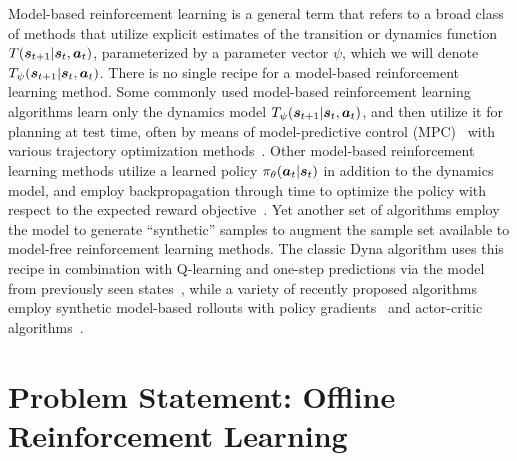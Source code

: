 \documentclass[../thesis.tex]{subfiles}
\begin{document}
Model-based reinforcement learning is a general term that refers to a broad class of methods that utilize explicit estimates of the transition or dynamics function $T(\boldsymbol{s}_{t+1}|\boldsymbol{s}_t,\boldsymbol{a}_t)$, parameterized by a parameter vector $\psi$, which we will denote $T_\psi(\boldsymbol{s}_{t+1}|\boldsymbol{s}_t,\boldsymbol{a}_t)$. There is no single recipe for a model-based reinforcement learning method. Some commonly used model-based reinforcement learning algorithms learn only the dynamics model $T_\psi(\boldsymbol{s}_{t+1}|\boldsymbol{s}_t,\boldsymbol{a}_t)$, and then utilize it for planning at test time, often by means of model-predictive control (MPC)~\citep{tassa2012synthesis} with various trajectory optimization methods~\citep{nagabandi2018neural,pets}. Other model-based reinforcement learning methods utilize a learned policy $\pi_\theta(\boldsymbol{a}_t|\boldsymbol{s}_t)$ in addition to the dynamics model, and employ backpropagation through time to optimize the policy with respect to the expected reward objective~\citep{deisenroth2011pilco}. Yet another set of algorithms employ the model to generate ``synthetic'' samples to augment the sample set available to model-free reinforcement learning methods. The classic Dyna algorithm uses this recipe in combination with Q-learning and one-step predictions via the model from previously seen states~\citep{sutton1991dyna}, while a variety of recently proposed algorithms employ synthetic model-based rollouts with policy gradients~\citep{pipps,simpl} and actor-critic algorithms~\citep{mbpo}. 

\section{Problem Statement: Offline Reinforcement Learning}
\end{document}
